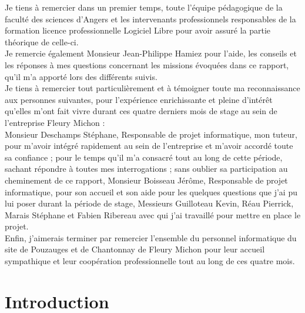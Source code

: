 \documentclass[a4paper,12pt]{extarticle}
\begin{document}
	Je tiens à remercier dans un premier temps, toute l’équipe pédagogique de la faculté des sciences d’Angers et les intervenants professionnels responsables de la formation licence professionnelle Logiciel Libre pour avoir assuré la partie théorique de celle-ci.\\
Je remercie également Monsieur Jean-Philippe Hamiez pour l’aide, les conseils et les réponses à mes questions concernant les missions évoquées dans ce rapport, qu’il m’a apporté lors des différents suivis.\\
Je tiens à remercier tout particulièrement et à témoigner toute ma reconnaissance aux personnes suivantes, pour l’expérience enrichissante et pleine d’intérêt qu’elles m’ont fait vivre durant ces quatre derniers mois de stage au sein de l’entreprise Fleury Michon : \\
Monsieur Deschamps Stéphane, Responsable de projet informatique, mon tuteur, pour m’avoir intégré rapidement au sein de l’entreprise et m’avoir accordé toute sa confiance ; pour le temps qu’il m’a consacré tout au long de cette période, sachant répondre à toutes mes interrogations ; sans oublier sa participation au cheminement de ce rapport, Monsieur Boisseau Jérôme, Responsable de projet informatique, pour son accueil et son aide pour les quelques questions que j’ai pu lui poser durant la période de stage, Messieurs Guilloteau Kevin, Réau Pierrick, Marais Stéphane et Fabien Ribereau avec qui j’ai travaillé pour mettre en place le projet.\\
Enfin, j’aimerais terminer par remercier l’ensemble du personnel informatique du site de Pouzauges et de Chantonnay de Fleury Michon pour leur accueil sympathique et leur coopération professionnelle tout au long de ces quatre mois.\\

	\clearpage
	
	\section{Introduction}
		\paragraph{}
\end{document}
